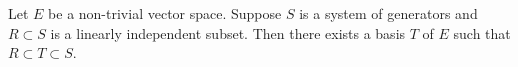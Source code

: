 Let $E$ be a non-trivial vector space. Suppose $S$ is a system of generators and $R \subset S$ is a linearly independent subset. Then there exists a basis $T$ of $E$ such that $R \subset T \subset S$.

